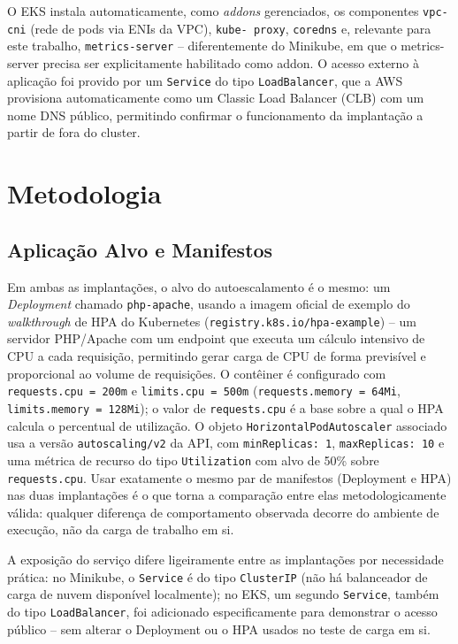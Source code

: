 \documentclass[12pt]{article}
\begin{document}
O EKS instala automaticamente, como \emph{addons} gerenciados, os
componentes \texttt{vpc-cni} (rede de pods via ENIs da VPC), \texttt{kube-
proxy}, \texttt{coredns} e, relevante para este trabalho,
\texttt{metrics-server} -- diferentemente do Minikube, em que o
metrics-server precisa ser explicitamente habilitado como addon. O acesso
externo à aplicação foi provido por um \texttt{Service} do tipo
\texttt{LoadBalancer}, que a AWS provisiona automaticamente como um Classic
Load Balancer (CLB) com um nome DNS público, permitindo confirmar o
funcionamento da implantação a partir de fora do cluster.

\section{Metodologia}

\subsection{Aplicação Alvo e Manifestos}

Em ambas as implantações, o alvo do autoescalamento é o mesmo: um
\emph{Deployment} chamado \texttt{php-apache}, usando a imagem oficial de
exemplo do \emph{walkthrough} de HPA do Kubernetes
(\texttt{registry.k8s.io/hpa-example}) -- um servidor PHP/Apache com um
endpoint que executa um cálculo intensivo de CPU a cada requisição,
permitindo gerar carga de CPU de forma previsível e proporcional ao volume
de requisições. O contêiner é configurado com \texttt{requests.cpu = 200m} e
\texttt{limits.cpu = 500m} (\texttt{requests.memory = 64Mi},
\texttt{limits.memory = 128Mi}); o valor de \texttt{requests.cpu} é a base
sobre a qual o HPA calcula o percentual de utilização. O objeto
\texttt{HorizontalPodAutoscaler} associado usa a versão
\texttt{autoscaling/v2} da API, com \texttt{minReplicas: 1},
\texttt{maxReplicas: 10} e uma métrica de recurso do tipo \texttt{Utilization}
com alvo de 50\% sobre \texttt{requests.cpu}. Usar exatamente o mesmo par de
manifestos (Deployment e HPA) nas duas implantações é o que torna a
comparação entre elas metodologicamente válida: qualquer diferença de
comportamento observada decorre do ambiente de execução, não da carga de
trabalho em si.

A exposição do serviço difere ligeiramente entre as implantações por
necessidade prática: no Minikube, o \texttt{Service} é do tipo
\texttt{ClusterIP} (não há balanceador de carga de nuvem disponível
localmente); no EKS, um segundo \texttt{Service}, também do tipo
\texttt{LoadBalancer}, foi adicionado especificamente para demonstrar o
acesso público -- sem alterar o Deployment ou o HPA usados no teste de
carga em si.
\end{document}
